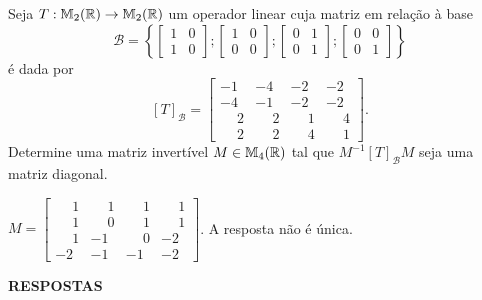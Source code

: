 \documentclass[12pt]{exam}
\begin{document}
\begin{exercicio}
    Seja $T : \mathbb{M}_2(\mathbb{R}) \to \mathbb{M}_2(\mathbb{R})$ um operador linear cuja matriz em relação à base
    \[
        \mathcal{B} = \left\{\begin{bmatrix}1 & 0\\ 1 & 0\end{bmatrix}; \begin{bmatrix}1 & 0\\ 0 & 0\end{bmatrix}; \begin{bmatrix}0 & 1\\ 0 & 1\end{bmatrix}; \begin{bmatrix}0 & 0\\ 0 & 1\end{bmatrix}\right\}
    \]
    é dada por
    \[
        [T]_\mathcal{B} = \begin{bmatrix}
            -1 & -4 & -2 & -2\\
            -4 & -1 & -2 & -2\\
            \phantom{-} 2 & \phantom{-} 2 & \phantom{-} 1 & \phantom{-} 4\\
            \phantom{-} 2 & \phantom{-} 2 & \phantom{-} 4 & \phantom{-} 1
        \end{bmatrix}.
    \]
    Determine uma matriz invertível $M \in \mathbb{M}_4(\mathbb{R})$ tal que $M^{-1}[T]_\mathcal{B}M$ seja uma matriz diagonal.
\begin{solucao}
    $M = \begin{bmatrix}
        \phantom{-} 1 & \phantom{-} 1 & \phantom{-} 1 & \phantom{-} 1\\
        \phantom{-} 1 & \phantom{-} 0 & \phantom{-} 1 & \phantom{-} 1\\
        \phantom{-} 1 & -1 & \phantom{-} 0 & -2\\
        -2 & -1 & -1 & -2
    \end{bmatrix}$. A resposta não é única.
\end{solucao}
\end{exercicio}

\newpage
{}

\begin{center}
    {\large\bf RESPOSTAS}
\end{center}


\end{document}
